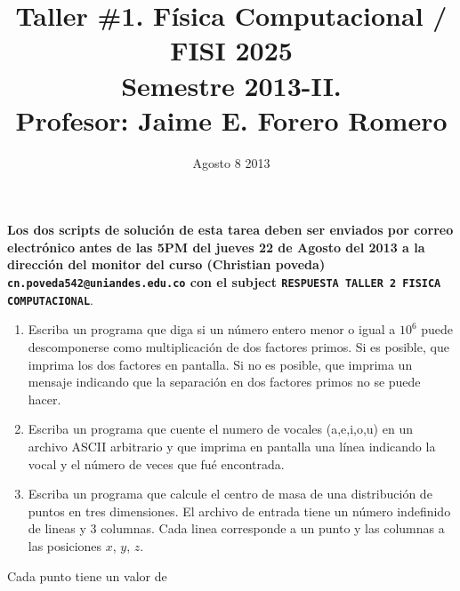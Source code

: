 \documentclass{article}
\title{Taller \#1. F\'isica Computacional / FISI 2025 \\Semestre 2013-II. \\ Profesor: Jaime E. Forero Romero}
\date{Agosto 8 2013}
\begin{document}
\maketitle

{\bf Los dos scripts de soluci\'on de esta tarea deben ser enviados por correo electr\'onico antes de las 5PM del jueves 22 de Agosto del 2013 a la direcci\'on del monitor del curso (Christian poveda) {\texttt{cn.poveda542@uniandes.edu.co}} con el subject \verb"RESPUESTA TALLER 2 FISICA COMPUTACIONAL"}.

\begin{enumerate}


\item Escriba un programa que diga si un n\'umero entero menor o igual a $10^6$ puede descomponerse como multiplicaci\'on de dos factores primos. Si es posible, que imprima los dos factores en pantalla. Si no es posible, que imprima un mensaje indicando que la separaci\'on en dos factores primos no se puede hacer.

\item Escriba un programa que cuente el numero de vocales (a,e,i,o,u) en un archivo ASCII arbitrario y que imprima en pantalla una l\'inea indicando la vocal y el n\'umero de veces que fu\'e encontrada.

\item Escriba un programa que calcule el centro de masa de una distribuci\'on de puntos en tres dimensiones. El archivo de entrada tiene un n\'umero indefinido de lineas y 3 columnas. Cada linea corresponde a un punto y las columnas a las posiciones $x$, $y$, $z$. 

\end{enumerate}

Cada punto tiene un valor de 
\end{document}
